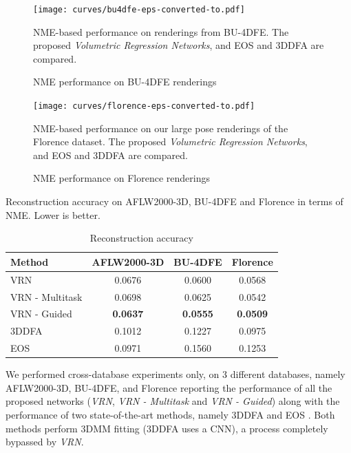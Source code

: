\begin{figure}
  \centering
  \texttt{[image: curves/bu4dfe-eps-converted-to.pdf]}
  \caption{NME performance on BU-4DFE renderings}{NME-based
    performance on renderings from BU-4DFE. The proposed
    \textit{Volumetric Regression Networks}, and EOS and 3DDFA are
    compared.}
  \label{roc:bu4dfe}
\end{figure}

\begin{figure}
  \centering
  \texttt{[image: curves/florence-eps-converted-to.pdf]}
  \caption{NME performance on Florence renderings}{NME-based
    performance on our large pose renderings of the Florence
    dataset. The proposed \textit{Volumetric Regression Networks}, and
    EOS and 3DDFA are compared.}
  \label{roc:florence}
\end{figure}



\begin{table}
  \caption{Reconstruction accuracy}{Reconstruction accuracy on
    AFLW2000-3D, BU-4DFE and Florence in terms of NME. Lower is
    better.}
  \label{tab:overview}
  \centering
  \small
\begin{tabular}{|l||c|c|c|}
  \hline
  \textbf{Method}   & \textbf{AFLW2000-3D} & \textbf{BU-4DFE} & \textbf{Florence} \\
  \hline\hline
  VRN & 0.0676   & 0.0600 & 0.0568   \\
  VRN - Multitask   & 0.0698        & 0.0625     & 0.0542        \\
  VRN - Guided    & \textbf{0.0637}   & \textbf{0.0555} & \textbf{0.0509}   \\
\hline
  3DDFA~\cite{zhu2016face}             & 0.1012   & 0.1227 & 0.0975   \\
  EOS~\cite{huber2016multiresolution}  & 0.0971   & 0.1560 & 0.1253   \\
  \hline
\end{tabular}
\vspace{-4mm}
\end{table}


We performed cross-database experiments only, on 3 different
databases, namely AFLW2000-3D, BU-4DFE, and Florence reporting the
performance of all the proposed networks (\textit{VRN}, \textit{VRN -
  Multitask} and \textit{VRN - Guided}) along with the performance of
two state-of-the-art methods, namely 3DDFA \cite{zhu2016face} and EOS
\cite{huber2016multiresolution}. Both methods perform 3DMM
fitting (3DDFA uses a CNN), a process completely bypassed by \textit{VRN}.


